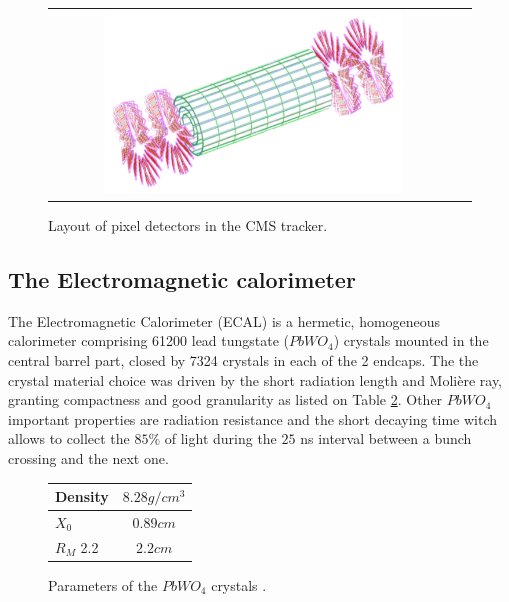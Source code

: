 \begin{figure}[tbh!]
	\centering
	\begin{tabular}{cc}
		\includegraphics[width=0.75\textwidth]{detector/pics/Pixel_layout.pdf}
	\end{tabular}
	\caption{Layout of pixel detectors in the CMS tracker.}
	\label{fig:Pixel_layout}
\end{figure}

\clearpage

\subsection{The Electromagnetic calorimeter}

The Electromagnetic Calorimeter (ECAL) is a hermetic, homogeneous calorimeter comprising 61200 lead tungstate ($PbWO_{4}$) crystals mounted in the central barrel part, closed by 7324 crystals in each of the 2 endcaps.
The the crystal material choice was driven by the short radiation length and Molière ray, granting compactness and good granularity as listed on Table \ref{table:CMS_PbWO4}. Other $PbWO_{4}$ important properties are radiation resistance and the short decaying time witch allows to collect the $85\%$ of light during the $25$ ns interval between a bunch crossing and the next one.

\begin{figure}[tbh!]
	\begin{center}
		
		\begin{tabular}{ | l | c |}
			\hline
			Density  & $ 8.28 g/cm^{3}$ \\ \hline
			$X_{0}$   & $0.89 cm$  \\ \hline
			$R_{M}$ 2.2 & $2.2 cm$  \\ \hline
			\hline
		\end{tabular}
		\caption{Parameters of the $PbWO_{4}$ crystals .}
		\label{table:CMS_PbWO4}
	\end{center}
\end{figure}

